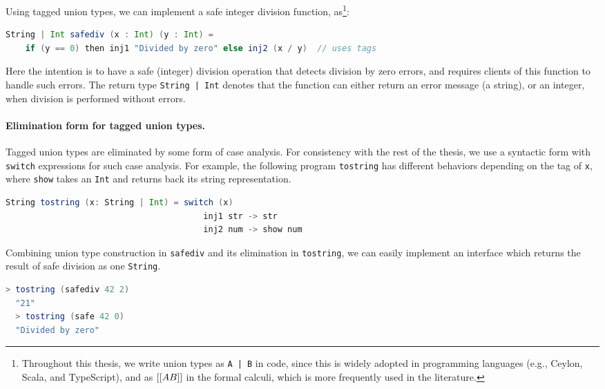 Using tagged union types, we can implement a safe integer
division function, as\footnote{Throughout this thesis, we write union types as \lstinline{A | B} in code,
  since this is widely adopted in programming languages
  (e.g., Ceylon, Scala, and TypeScript),
  and as $[[A \/ B]]$ in the formal calculi, which is
  more frequently used in the literature.}:

\begin{lstlisting}[language=Scala]
  String | Int safediv (x : Int) (y : Int) =
    if (y == 0) then inj1 "Divided by zero" else inj2 (x / y)  // uses tags
\end{lstlisting}

\noindent Here the intention is to have a safe (integer) division operation that detects
division by zero errors, and requires clients of this function to handle
such errors. The return type \lstinline{String | Int} denotes that the function
can either return an error message (a string), or an integer, when division
is performed without errors.

\paragraph*{Elimination form for tagged union types.}
Tagged union types are eliminated by some form of case analysis.
For consistency with the rest of the thesis, we use a syntactic form with
\lstinline{switch} expressions for such case analysis. For example,
the following program \lstinline{tostring} has different behaviors depending on the
tag of \lstinline{x}, where \lstinline{show} takes an \lstinline{Int} and
returns back its string representation.

\begin{lstlisting}[language=Scala]
  String tostring (x: String | Int) = switch (x)
                                        inj1 str -> str
                                        inj2 num -> show num
\end{lstlisting}

\noindent Combining union type construction in \lstinline{safediv} and its elimination in
\lstinline{tostring}, we can easily implement an interface which returns the
result of safe division as one \lstinline{String}.

\begin{lstlisting}[language=Scala]
  > tostring (safediv 42 2)
  "21"
  > tostring (safe 42 0)
  "Divided by zero"
\end{lstlisting}


